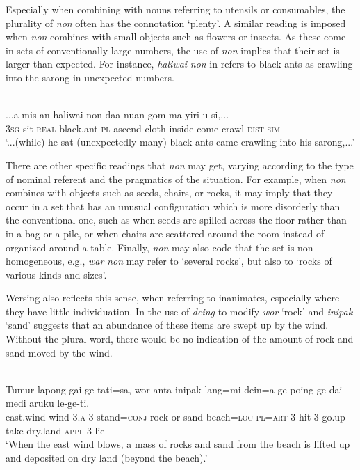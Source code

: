 Especially when combining with nouns referring to utensils or consumables, the plurality of \textit{non} often has the connotation `plenty'. A similar reading is imposed when \textit{non} combines with small objects such as flowers or insects. As these come in sets of conventionally large numbers, the use of \textit{non} implies that their set is larger than expected. For instance, \textit{haliwai} \textit{non} in  refers to black ants as crawling into the sarong in unexpected numbers.

\ea%
\label{ex:9:74}\\
\gll ...a mis-an haliwai non daa nuan gom ma yiri  u si,... \\
  \textsc{3sg} sit-\textsc{real} black.ant \textsc{pl} ascend cloth inside come crawl \textsc{dist} \textsc{sim}  \\
\glt `...(while) he sat (unexpectedly many) black ants came crawling into his sarong,...'
\z






There are other specific readings that \textit{non} may get, varying according to the type of nominal referent and the pragmatics of the situation. For example, when \textit{non} combines with objects such as seeds, chairs, or rocks, it may imply that they occur in a set that has an unusual configuration which is more disorderly than the conventional one, such as when seeds are spilled across the floor rather than in a bag or a pile, or when chairs are scattered around the room instead of organized around a table. Finally, \textit{non} may also code that the set is non-homogeneous, e.g., \textit{war} \textit{non} may refer to `several rocks', but also to `rocks of various kinds and sizes'.

Wersing also reflects this sense, when referring to inanimates, especially where they have little individuation. In  the use of \textit{deing} to modify \textit{wor} `rock' and \textit{inipak} `sand' suggests that an abundance of these items are swept up by the wind. Without the plural word, there would be no indication of the amount of rock and sand moved by the wind.


\ea%
\label{ex:9:75}
 \\
\gll  Tumur lapong gai ge-tati=sa, wor anta inipak lang=mi dein=a ge-poing ge-dai medi aruku le-ge-ti.   \\
  east.wind wind 3.\textsc{a} 3-stand=\textsc{conj} rock or sand beach=\textsc{loc}   \textsc{pl=art} \textsc{3-}hit 3-go.up take dry.land \textsc{appl-3-}lie \\
\glt `When the east wind blows, a mass of rocks and sand from the beach is lifted up and deposited on dry land (beyond the beach).'
\z










